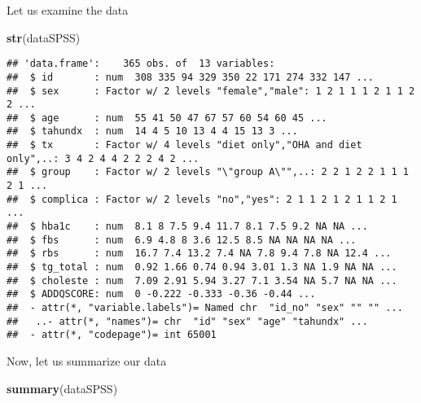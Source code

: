 \documentclass[]{book}
\newenvironment{Shaded}{\begin{snugshade}}{\end{snugshade}}
\newcommand{\KeywordTok}[1]{\textcolor[rgb]{0.13,0.29,0.53}{\textbf{{#1}}}}
\newcommand{\NormalTok}[1]{{#1}}
\theoremstyle{definition}
\theoremstyle{definition}
\theoremstyle{remark}
\begin{document}
Let us examine the data

\begin{Shaded}
\begin{Highlighting}[]
\KeywordTok{str}\NormalTok{(dataSPSS)}
\end{Highlighting}
\end{Shaded}

\begin{verbatim}
## 'data.frame':    365 obs. of  13 variables:
##  $ id       : num  308 335 94 329 350 22 171 274 332 147 ...
##  $ sex      : Factor w/ 2 levels "female","male": 1 2 1 1 1 2 1 1 2 2 ...
##  $ age      : num  55 41 50 47 67 57 60 54 60 45 ...
##  $ tahundx  : num  14 4 5 10 13 4 4 15 13 3 ...
##  $ tx       : Factor w/ 4 levels "diet only","OHA and diet only",..: 3 4 2 4 4 2 2 2 4 2 ...
##  $ group    : Factor w/ 2 levels "\"group A\"",..: 2 2 1 2 2 1 1 1 2 1 ...
##  $ complica : Factor w/ 2 levels "no","yes": 2 1 1 2 1 2 1 1 2 1 ...
##  $ hba1c    : num  8.1 8 7.5 9.4 11.7 8.1 7.5 9.2 NA NA ...
##  $ fbs      : num  6.9 4.8 8 3.6 12.5 8.5 NA NA NA NA ...
##  $ rbs      : num  16.7 7.4 13.2 7.4 NA 7.8 9.4 7.8 NA 12.4 ...
##  $ tg_total : num  0.92 1.66 0.74 0.94 3.01 1.3 NA 1.9 NA NA ...
##  $ choleste : num  7.09 2.91 5.94 3.27 7.1 3.54 NA 5.7 NA NA ...
##  $ ADDQSCORE: num  0 -0.222 -0.333 -0.36 -0.44 ...
##  - attr(*, "variable.labels")= Named chr  "id_no" "sex" "" "" ...
##   ..- attr(*, "names")= chr  "id" "sex" "age" "tahundx" ...
##  - attr(*, "codepage")= int 65001
\end{verbatim}

Now, let us summarize our data

\begin{Shaded}
\begin{Highlighting}[]
\KeywordTok{summary}\NormalTok{(dataSPSS)}
\end{Highlighting}
\end{Shaded}
\end{document}
